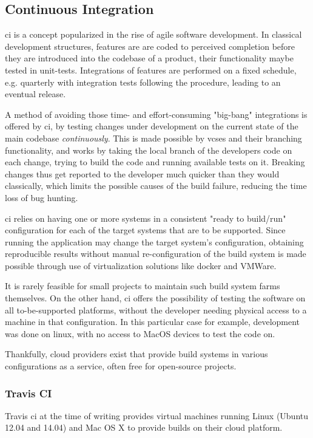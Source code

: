 \subsection{Continuous Integration}
\gls{ci} is a concept popularized in the rise of agile software development. In classical development structures, features are are coded to perceived completion before they are introduced into the codebase of a product, their functionality maybe tested in unit-tests. Integrations of features are performed on a fixed schedule, e.g. quarterly with integration tests following the procedure, leading to an eventual release.

A method of avoiding those time- and effort-consuming "big-bang" integrations is offered by \gls{ci}, by testing changes under development on the current state of the main codebase \textit{continuously}. This is made possible by \gls{vcs}es and their branching functionality, and works by taking the local branch of the developers code on each change, trying to build the code and running available tests on it. Breaking changes thus get reported to the developer much quicker than they would classically, which limits the possible causes of the build failure, reducing the time loss of bug hunting.

\gls{ci} relies on having one or more systems in a consistent "ready to build/run" configuration for each of the target systems that are to be supported. Since running the application may change the target system's configuration, obtaining reproducible results without manual re-configuration of the build system is made possible through use of virtualization solutions like docker and VMWare.

It is rarely feasible for small projects to maintain such build system farms themselves. On the other hand, \gls{ci} offers the possibility of testing the software on all to-be-supported platforms, without the developer needing physical access to a machine in that configuration. In this particular case for example, development was done on linux, with no access to MacOS devices to test the code on.

Thankfully, \gls{cloud} providers exist that provide build systems in various configurations as a service, often free for open-source projects.

\subsubsection{Travis CI}
Travis \gls{ci} at the time of writing provides virtual machines running Linux (Ubuntu 12.04 and 14.04) and Mac OS X to provide builds on their \gls{cloud} platform.

